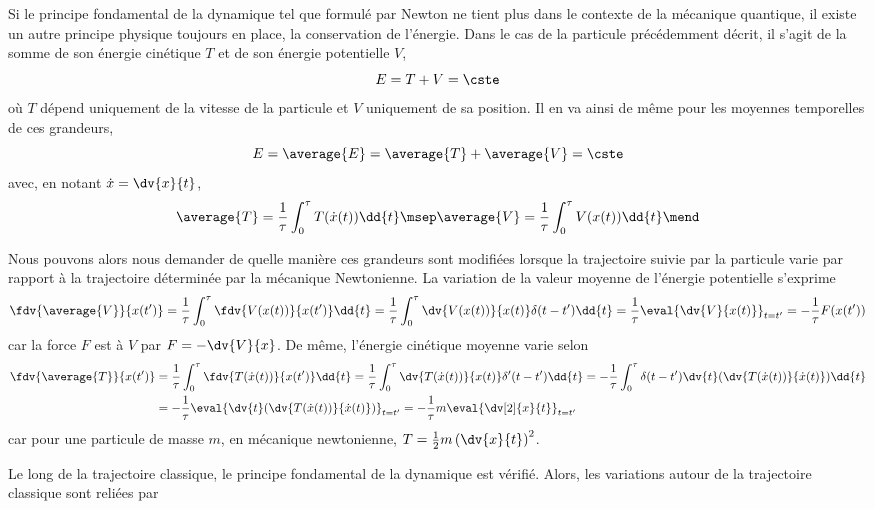 \par Si le principe fondamental de la dynamique tel que formulé par Newton ne tient plus dans le contexte de la mécanique quantique, il existe un autre principe physique toujours en place, la conservation de l'énergie. Dans le cas de la particule précédemment décrit, il s'agit de la somme de son énergie cinétique $T$ et de son énergie potentielle $V$, \ie
\begin{equation}
E = T + V = \cste
\end{equation}
où $T$ dépend uniquement de la vitesse de la particule et $V$ uniquement de sa position. %
Il en va ainsi de même pour les moyennes temporelles de ces grandeurs,
\begin{equation}
E = \average{E} = \average{T} + \average{V} = \cste
\end{equation}
avec, en notant $\dot{x}=\dv{x}{t}$,
\begin{equation}
\average{T} = \frac{1}{\tau}\int_0^\tau T(\dot{x}(t)) \dd{t}
\msep
\average{V} = \frac{1}{\tau}\int_0^\tau V(x(t)) \dd{t}
\mend
\end{equation}
\par
Nous pouvons alors nous demander de quelle manière ces grandeurs sont modifiées lorsque la trajectoire suivie par la particule varie par rapport à la trajectoire déterminée par la mécanique Newtonienne. La variation de la valeur moyenne de l'énergie potentielle s'exprime
\begin{equation}
\fdv{\average{V}}{x(t')}
= \frac{1}{\tau}\int_0^\tau \fdv{V(x(t))}{x(t')} \dd{t}
= \frac{1}{\tau}\int_0^\tau \dv{V(x(t))}{x(t)}\delta(t-t') \dd{t}
= \frac{1}{\tau}\eval{\dv{V}{x(t)}}_{t=t'}
= -\frac{1}{\tau}F(x(t'))
\end{equation}
car la force $F$ est à $V$ par $F = - \dv{V}{x}$.
De même, l'énergie cinétique moyenne varie selon
\begin{align}
\fdv{\average{T}}{x(t')}
&
= \frac{1}{\tau}\int_0^\tau \fdv{T(\dot{x}(t))}{x(t')} \dd{t}
=\frac{1}{\tau}\int_0^\tau \dv{T(\dot{x}(t))}{x(t)}\delta'(t-t') \dd{t}
=-\frac{1}{\tau}\int_0^\tau \delta(t-t') \dv{t}(\dv{T(\dot{x}(t))}{\dot{x}(t)}) \dd{t}
\nonumber
\\&
=-\frac{1}{\tau}\eval{\dv{t}(\dv{T(\dot{x}(t))}{\dot{x}(t)})}_{t=t'}
=-\frac{1}{\tau}m\eval{\dv[2]{x}{t}}_{t=t'}
\end{align}
car pour une particule de masse $m$, en mécanique newtonienne, $T = \frac{1}{2}m\left(\dv{x}{t}\right)^2$.
\par
Le long de la trajectoire classique, le principe fondamental de la dynamique est vérifié. Alors, les variations autour de la trajectoire classique sont reliées par
